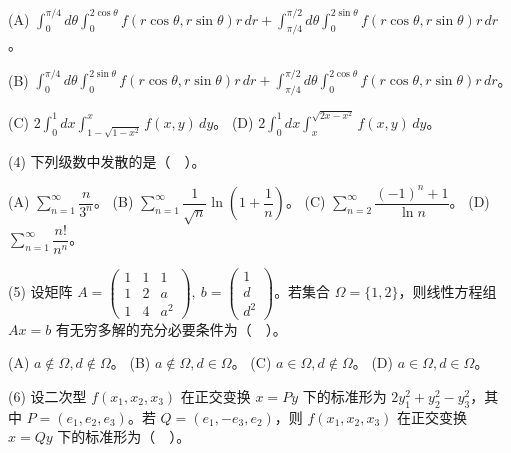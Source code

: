 \documentclass[UTF8,12pt]{ctexart}
\begin{document}
(A) \(\displaystyle \int_0^{\pi/4}d\theta\displaystyle \int_0^{2\cos\theta}f(r\cos\theta,\allowbreak r\sin\theta)r\,dr+\displaystyle \int_{\pi/4}^{\pi/2}d\theta\displaystyle \int_0^{2\sin\theta}f(r\cos\theta,\allowbreak r\sin\theta)r\,dr\)。


(B) \(\displaystyle \int_0^{\pi/4}d\theta\displaystyle \int_0^{2\sin\theta}f(r\cos\theta,\allowbreak r\sin\theta)r\,dr+\displaystyle \int_{\pi/4}^{\pi/2}d\theta\displaystyle \int_0^{2\cos\theta}f(r\cos\theta,\allowbreak r\sin\theta)r\,dr\)。


(C) \(\displaystyle 2\displaystyle \int_0^1dx\displaystyle \int_{1-\sqrt{1-x^2}}^x f(x,\allowbreak y)\,dy\)。 (D) \(\displaystyle 2\displaystyle \int_0^1dx\displaystyle \int_x^{\sqrt{2x-x^2}}f(x,\allowbreak y)\,dy\)。


(4) 下列级数中发散的是（　）。


(A) \(\displaystyle \sum_{n=1}^{\infty}\dfrac{\displaystyle n}{\displaystyle 3^n}\)。 (B) \(\displaystyle \sum_{n=1}^{\infty}\dfrac{\displaystyle 1}{\displaystyle \sqrt n}\ln\left(1+\dfrac{\displaystyle 1}{\displaystyle n}\right)\)。 (C) \(\displaystyle \sum_{n=2}^{\infty}\dfrac{\displaystyle (-1)^n+1}{\displaystyle \ln n}\)。 (D) \(\displaystyle \sum_{n=1}^{\infty}\dfrac{\displaystyle n!}{\displaystyle n^n}\)。


(5) 设矩阵 \(\displaystyle A=\begin{pmatrix}1&1&1\\1&2&a\\1&4&a^2\end{pmatrix},\allowbreak \ b=\begin{pmatrix}1\\d\\d^2\end{pmatrix}\)。若集合 \(\displaystyle \Omega=\{1,\allowbreak 2\}\)，则线性方程组 \(\displaystyle Ax=b\) 有无穷多解的充分必要条件为（　）。


(A) \(\displaystyle a\notin\Omega,\allowbreak d\notin\Omega\)。 (B) \(\displaystyle a\notin\Omega,\allowbreak d\in\Omega\)。 (C) \(\displaystyle a\in\Omega,\allowbreak d\notin\Omega\)。 (D) \(\displaystyle a\in\Omega,\allowbreak d\in\Omega\)。


(6) 设二次型 \(\displaystyle f(x_1,\allowbreak x_2,\allowbreak x_3)\) 在正交变换 \(\displaystyle x=Py\) 下的标准形为 \(\displaystyle 2y_1^2+y_2^2-y_3^2\)，其中 \(\displaystyle P=(e_1,\allowbreak e_2,\allowbreak e_3)\)。若 \(\displaystyle Q=(e_1,\allowbreak -e_3,\allowbreak e_2)\)，则 \(\displaystyle f(x_1,\allowbreak x_2,\allowbreak x_3)\) 在正交变换 \(\displaystyle x=Qy\) 下的标准形为（　）。
\end{document}

